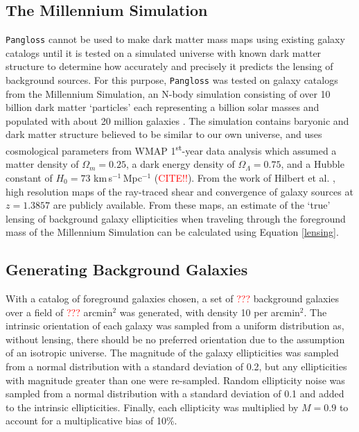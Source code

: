\documentclass[%
 reprint,
 amsmath,amssymb,
 aps,nofootinbib
]{revtex4-1}
\begin{document}
\subsection{The Millennium Simulation} \label{ms}
\texttt{Pangloss} cannot be used to make dark matter mass maps using existing galaxy catalogs until it is tested on a simulated universe with known dark matter structure to determine how accurately and precisely it predicts the lensing of background sources. For this purpose, \texttt{Pangloss} was tested on galaxy catalogs from the Millennium Simulation, an N-body simulation consisting of over 10 billion dark matter `particles' each representing a billion solar masses and populated with about 20 million galaxies \cite{millennium_simulation}. The simulation contains baryonic and dark matter structure believed to be similar to our own universe, and uses cosmological parameters from WMAP 1\textsuperscript{st}-year data analysis which assumed a matter density of $\Omega_m=0.25$, a dark energy density of $\Omega_\Lambda=0.75$, and a Hubble constant of $H_0=73$ km$\,$s$^{-1}\,$Mpc$^{-1}$ (\textcolor{red}{CITE!!}). From the work of Hilbert et al. \cite{ray_tracing}, high resolution maps of the ray-traced shear and convergence of galaxy sources at $z=1.3857$ are publicly available. From these maps, an estimate of the `true' lensing of background galaxy ellipticities when traveling through the foreground mass of the Millennium Simulation can be calculated using Equation \eqref{lensing}.


\subsection{Generating Background Galaxies}
With a catalog of foreground galaxies chosen, a set of \textcolor{red}{???} background galaxies over a field of \textcolor{red}{???} arcmin$^2$ was generated, with density 10 per arcmin$^2$. The intrinsic orientation of each galaxy was sampled from a uniform distribution as, without lensing, there should be no preferred orientation due to the assumption of an isotropic universe. The magnitude of the galaxy ellipticities was sampled from a normal distribution with a standard deviation of 0.2, but any ellipticities with magnitude greater than one were re-sampled. Random ellipticity noise was sampled from a normal distribution with a standard deviation of 0.1 and added to the intrinsic ellipticities. Finally, each ellipticity was multiplied by $M=0.9$ to account for a multiplicative bias of 10\%.
\end{document}

